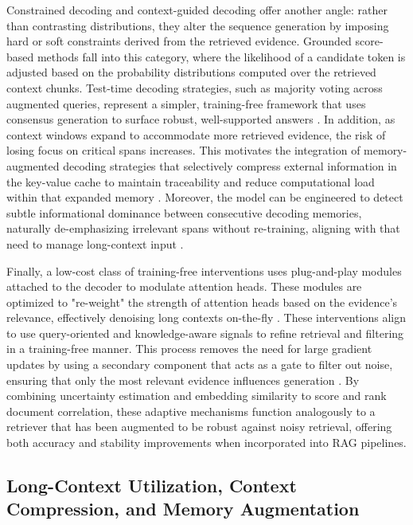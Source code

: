 \documentclass[11pt,a4paper]{article}
\begin{document}
Constrained decoding and context-guided decoding offer another angle: rather than contrasting distributions, they alter the sequence generation by imposing hard or soft constraints derived from the retrieved evidence. Grounded score-based methods fall into this category, where the likelihood of a candidate token is adjusted based on the probability distributions computed over the retrieved context chunks. Test-time decoding strategies, such as majority voting across augmented queries, represent a simpler, training-free framework that uses consensus generation to surface robust, well-supported answers \cite{arxiv:2504.15909v2}. In addition, as context windows expand to accommodate more retrieved evidence, the risk of losing focus on critical spans increases. This motivates the integration of memory-augmented decoding strategies that selectively compress external information in the key-value cache to maintain traceability and reduce computational load within that expanded memory \cite{arxiv:2502.15734v1}. Moreover, the model can be engineered to detect subtle informational dominance between consecutive decoding memories, naturally de-emphasizing irrelevant spans without re-training, aligning with that need to manage long-context input \cite{arxiv:2410.07590v1}.

Finally, a low-cost class of training-free interventions uses plug-and-play modules attached to the decoder to modulate attention heads. These modules are optimized to "re-weight" the strength of attention heads based on the evidence's relevance, effectively denoising long contexts on-the-fly \cite{arxiv:2506.00054v1}. These interventions align to use query-oriented and knowledge-aware signals to refine retrieval and filtering in a training-free manner. This process removes the need for large gradient updates by using a secondary component that acts as a gate to filter out noise, ensuring that only the most relevant evidence influences generation \cite{arxiv:2309.15217v1}. By combining uncertainty estimation and embedding similarity to score and rank document correlation, these adaptive mechanisms function analogously to a retriever that has been augmented to be robust against noisy retrieval, offering both accuracy and stability improvements when incorporated into RAG pipelines.


\subsection{Long-Context Utilization, Context Compression, and Memory Augmentation}
\end{document}
